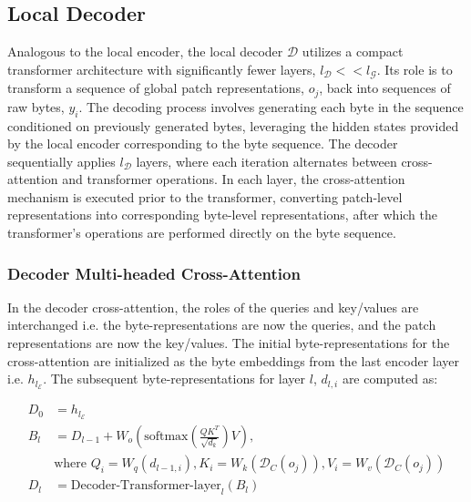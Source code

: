 \subsection{Local Decoder} 

Analogous to the local encoder, the local decoder $\mathcal{D}$ utilizes a compact transformer architecture with significantly fewer layers, $l_{\mathcal{D}} << l_{\mathcal{G}}$. Its role is to transform a sequence of global patch representations, $o_j$, back into sequences of raw bytes, $y_i$. The decoding process involves generating each byte in the sequence conditioned on previously generated bytes, leveraging the hidden states provided by the local encoder corresponding to the byte sequence. The decoder sequentially applies $l_{\mathcal{D}}$ layers, where each iteration alternates between cross-attention and transformer operations. In each layer, the cross-attention mechanism is executed prior to the transformer, converting patch-level representations into corresponding byte-level representations, after which the transformer's operations are performed directly on the byte sequence.

\subsubsection{Decoder Multi-headed Cross-Attention} 

In the decoder cross-attention, the roles of the queries and key/values are interchanged i.e. the byte-representations are now the queries, and the patch representations are now the key/values. The initial byte-representations for the cross-attention are initialized as the byte embeddings from the last encoder layer i.e. $h_{l_{\mathcal{E}}}$. The subsequent byte-representations for layer $l$, $d_{l,i}$ are computed as:

\begin{align}
D_0 &= h_{l_{\mathcal{E}}} \\
B_l &= D_{l-1} + W_o\left(\text{softmax}\left(\frac{QK^T}{\sqrt{d_k}}\right)V\right), \\
  &\text{where } Q_i = W_q(d_{l-1,i}), K_i = W_k(\mathcal{D}_C(o_j)), V_i = W_v(\mathcal{D}_C(o_j)) \\
  D_l &= \text{Decoder-Transformer-layer}_l(B_l)
\end{align}

